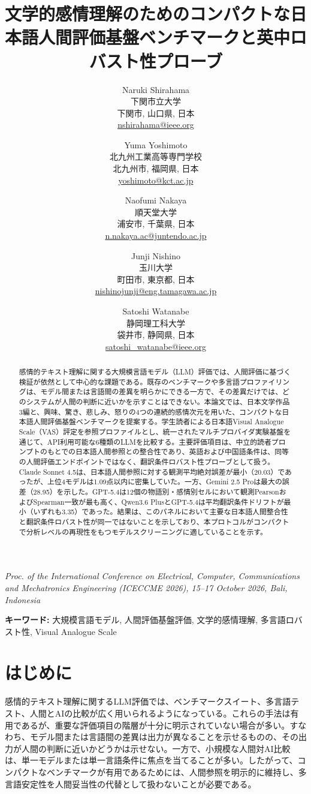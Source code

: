 \documentclass[lualatex,ja=standard,a4paper,11pt]{bxjsarticle}
\title{文学的感情理解のためのコンパクトな日本語人間評価基盤ベンチマークと英中ロバスト性プローブ}
\author{%
Naruki Shirahama\\
下関市立大学\\
下関市, 山口県, 日本\\
\url{nshirahama@ieee.org}
\and
Yuma Yoshimoto\\
北九州工業高等専門学校\\
北九州市, 福岡県, 日本\\
\url{yoshimoto@kct.ac.jp}
\and
Naofumi Nakaya\\
順天堂大学\\
浦安市, 千葉県, 日本\\
\url{n.nakaya.ac@juntendo.ac.jp}
\and
Junji Nishino\\
玉川大学\\
町田市, 東京都, 日本\\
\url{nishinojunji@eng.tamagawa.ac.jp}
\and
Satoshi Watanabe\\
静岡理工科大学\\
袋井市, 静岡県, 日本\\
\url{satoshi_watanabe@ieee.org}
}
\date{}
\begin{document}
\maketitle

\begin{center}
\small
\textit{Proc. of the International Conference on Electrical, Computer, Communications and Mechatronics Engineering (ICECCME 2026), 15--17 October 2026, Bali, Indonesia}
\end{center}

\begin{abstract}
感情的テキスト理解に関する大規模言語モデル（LLM）評価では、人間評価に基づく検証が依然として中心的な課題である。既存のベンチマークや多言語プロファイリングは、モデル間または言語間の差異を明らかにできる一方で、その差異だけでは、どのシステムが人間の判断に近いかを示すことはできない。本論文では、日本文学作品3編と、興味、驚き、悲しみ、怒りの4つの連続的感情次元を用いた、コンパクトな日本語人間評価基盤ベンチマークを提案する。学生読者による日本語Visual Analogue Scale（VAS）評定を参照プロファイルとし、統一されたマルチプロバイダ実験基盤を通じて、API利用可能な6種類のLLMを比較する。主要評価項目は、中立的読者プロンプトのもとでの日本語人間参照との整合性であり、英語および中国語条件は、同等の人間評価エンドポイントではなく、翻訳条件ロバスト性プローブとして扱う。Claude Sonnet 4.5は、日本語人間参照に対する観測平均絶対誤差が最小（20.03）であったが、上位4モデルは1.09点以内に密集していた。一方、Gemini 2.5 Proは最大の誤差（28.95）を示した。GPT-5.4は12個の物語別・感情別セルにおいて観測PearsonおよびSpearman一致が最も高く、Qwen3.6 PlusとGPT-5.4は平均翻訳条件ドリフトが最小（いずれも3.35）であった。結果は、このパネルにおいて主要な日本語人間整合性と翻訳条件ロバスト性が同一ではないことを示しており、本プロトコルがコンパクトで分析レベルの再現性をもつモデルスクリーニングに適していることを示す。
\end{abstract}

\noindent\textbf{キーワード:}
大規模言語モデル, 人間評価基盤評価, 文学的感情理解, 多言語ロバスト性, Visual Analogue Scale

\section{はじめに}

感情的テキスト理解に関するLLM評価では、ベンチマークスイート、多言語テスト、人間とAIの比較が広く用いられるようになっている。これらの手法は有用であるが、重要な評価項目の階層が十分に明示されていない場合が多い。すなわち、モデル間または言語間の差異は出力が異なることを示せるものの、その出力が人間の判断に近いかどうかは示せない。一方で、小規模な人間対AI比較は、単一モデルまたは単一言語条件に焦点を当てることが多い\cite{shirahama2025vas,paech2024eqbench,huang2024emotionbench}。したがって、コンパクトなベンチマークが有用であるためには、人間参照を明示的に維持し、多言語安定性を人間妥当性の代替として扱わないことが必要である。
\end{document}

